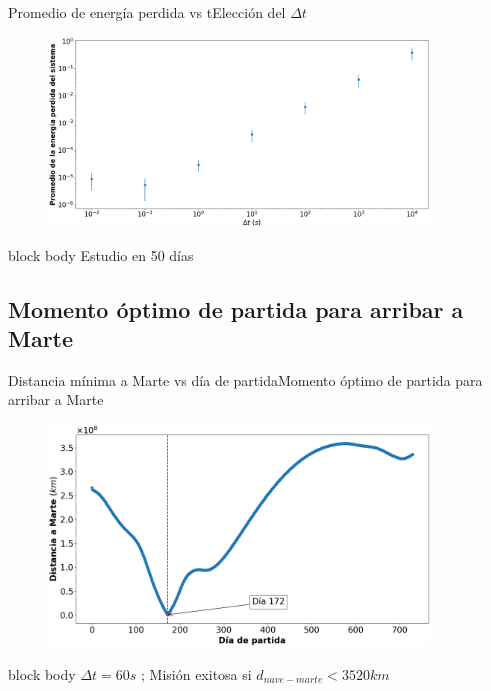 \documentclass{beamer}
\begin{document}
            \begin{frame}{Promedio de energía perdida vs \Delta t}{Elección del $\Delta t$}
                \begin{figure}[H!]
                    \includegraphics[width=0.9\textwidth]{./promedio_energia_perdida_vs_dt}
                    \label{fig:marte_4}
                \end{figure}
                \begin{beamercolorbox}[sep=5pt,center]{block body}
                    \centering
                    \small{Estudio en 50 días}
                \end{beamercolorbox}
            \end{frame}

        \subsection{Momento óptimo de partida para arribar a Marte}

            \begin{frame}{Distancia mínima a Marte vs día de partida}{Momento óptimo de partida para arribar a Marte}
                \begin{figure}[H!]
                    \includegraphics[width=0.9\textwidth]{./distancia_a_marte_vs_dia_de_partida}
                    \label{fig:marte_5}
                \end{figure}
                \begin{beamercolorbox}[sep=5pt,center]{block body}
                    \centering
                    \small{$\Delta t = 60s$ ; Misión exitosa si $d_{nave-marte} < 3520 km$}
                \end{beamercolorbox}
            \end{frame}
\end{document}
